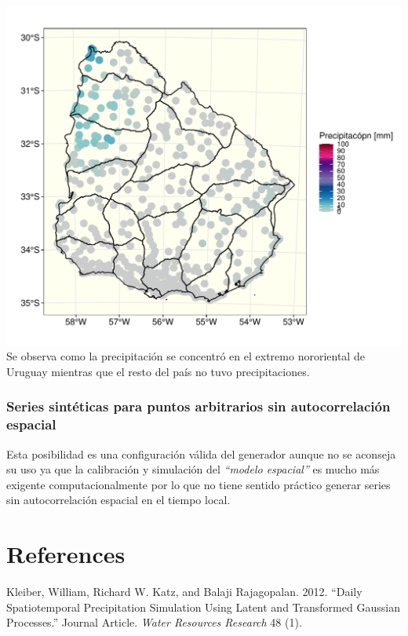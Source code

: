 \documentclass[
  12pt]{article}
\begin{document}
\includegraphics{Manual_Generador_files/figure-latex/prcp-localidades-uy-1.pdf}
Se observa como la precipitación se concentró en el extremo nororiental de Uruguay mientras que el resto del país no tuvo precipitaciones.

\hypertarget{series-sintuxe9ticas-para-puntos-arbitrarios-sin-autocorrelaciuxf3n-espacial}{%
\subsubsection{Series sintéticas para puntos arbitrarios sin autocorrelación espacial}\label{series-sintuxe9ticas-para-puntos-arbitrarios-sin-autocorrelaciuxf3n-espacial}}

Esta posibilidad es una configuración válida del generador aunque no se aconseja su uso ya que la calibración y simulación del \emph{``modelo espacial''} es mucho más exigente computacionalmente por lo que no tiene sentido práctico generar series sin autocorrelación espacial en el tiempo local.

\hypertarget{references}{%
\section*{References}\label{references}}

\hypertarget{refs}{}
\leavevmode\hypertarget{ref-RN3539}{}%
Kleiber, William, Richard W. Katz, and Balaji Rajagopalan. 2012. ``Daily Spatiotemporal Precipitation Simulation Using Latent and Transformed Gaussian Processes.'' Journal Article. \emph{Water Resources Research} 48 (1).
\end{document}

